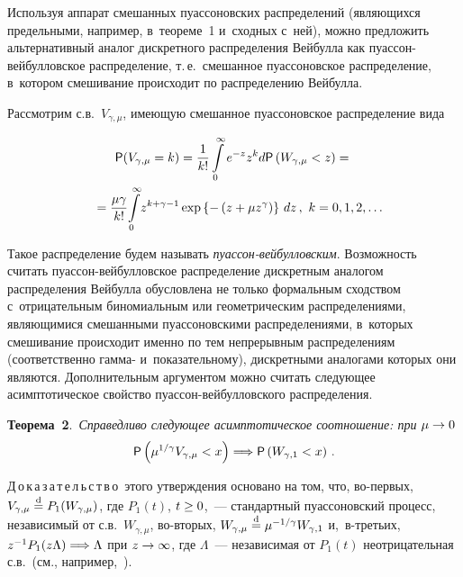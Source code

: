 \begin{multicols}{2}
Используя аппарат смешанных пуассоновских распределений (являющихся
предельными, например, в~теореме~1 и~сходных с~ней), можно предложить
альтернативный аналог дискретного распределения Вейбулла как
пуас\-сон-вей\-бул\-лов\-ское распределение, т.\,е.\ смешанное пуассоновское
распределение, в~котором смешивание происходит по распределению
Вейбулла.

Рассмотрим с.в.~$V_{\gamma,\mu}$, имеющую смешанное пуассоновское
распределение вида

\vspace*{-2pt}

\noindent
\begin{multline*}
{\sf P}(V_{\gamma,\mu}=k)=\displaystyle\frac{\displaystyle 1\mathstrut}{\displaystyle k!\mathstrut}\int\limits_{0}^{\infty}e^{-z}z^kd{\sf P}
\left(W_{\gamma,\mu}<z\right)={}\\
{}=
\displaystyle\frac{\displaystyle \mu\gamma\mathstrut}{\displaystyle k!\mathstrut}\!\int\limits_{0}^{\infty}\!z^{k+\gamma-1}\exp\left\{-\left(z+\mu 
z^{\gamma}\right)\right\}\,dz\,,\ k=0,1,2,\ldots\hspace*{-6.64555pt}
\end{multline*}

\vspace*{-2pt}

\noindent
Такое распределение будем называть \textit{пуас\-сон-вей\-бул\-лов\-ским}.
Возможность считать пуас\-сон-вей\-буллов\-ское распределение дискретным
аналогом распределения Вейбулла обусловлена не только формальным
сходством с~отрицательным биномиальным или геометрическим
распределениями, являющимися смешанными пуассоновскими
распределениями, в~которых смешивание происходит именно по тем
непрерывным распределениям (соответственно гамма- и~показательному),
дискретными аналогами которых они являются. Дополнительным
аргументом можно считать следующее асимптотическое свойство
пуас\-сон-вей\-бул\-лов\-ско\-го распределения.

\smallskip

\noindent
\textbf{Теорема~2}.\ \textit{Справедливо следующее асимптотическое
соотношение: при} $\mu\hm\to 0$
$$
{\sf P}\left(\mu^{1/\gamma}V_{\gamma,\mu}<x\right)\Longrightarrow 
{\sf P}\left(W_{\gamma,1}<x\right)\,.
$$

\smallskip

\noindent
Д\,о\,к\,а\,з\,а\,т\,е\,л\,ь\,с\,т\,в\,о\ этого утверждения основано на том, что,
во-пер\-вых, $V_{\gamma,\mu}\stackrel{\mathrm{d}}{=} P_1(W_{\gamma,\mu})$, где $P_1(t)$,
$t\hm\ge0$,~--- стандартный пуассоновский процесс, независимый от 
с.в.~$W_{\gamma,\mu}$, во-вто\-рых, $W_{\gamma,\mu}\stackrel{\mathrm{d}}{=} \mu^{-1/\gamma}W_{\gamma,1}$ 
и,~в-треть\-их, $z^{-1}P_1(z\Lambda)\hm\Longrightarrow \Lambda$ при $z\hm\to\infty$, где
$\Lambda$~--- независимая от $P_1(t)$ неотрицательная с.в.\ (см.,
например,~\cite{KorolevBeningShorgin2011}).


\end{multicols}
